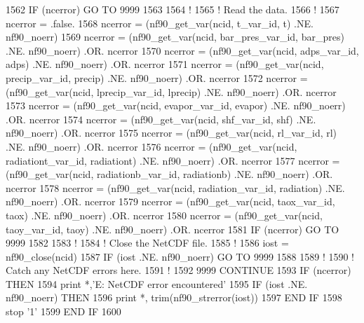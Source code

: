 \begin{DoxyCode}
1562     \textcolor{keywordflow}{IF} (ncerror) \textcolor{keywordflow}{GO TO} 9999
1563 
1564     \textcolor{comment}{!}
1565     \textcolor{comment}{! Read the data.}
1566     \textcolor{comment}{!}
1567     ncerror = .false.
1568     ncerror = (nf90\_get\_var(ncid, t\_var\_id, t)                          .NE. nf90\_noerr)
1569     ncerror = (nf90\_get\_var(ncid, bar\_pres\_var\_id, bar\_pres)            .NE. nf90\_noerr) .OR. ncerror
1570     ncerror = (nf90\_get\_var(ncid, adps\_var\_id, adps)                    .NE. nf90\_noerr) .OR. ncerror
1571     ncerror = (nf90\_get\_var(ncid, precip\_var\_id, precip)                .NE. nf90\_noerr) .OR. ncerror
1572     ncerror = (nf90\_get\_var(ncid, lprecip\_var\_id, lprecip)              .NE. nf90\_noerr) .OR. ncerror
1573     ncerror = (nf90\_get\_var(ncid, evapor\_var\_id, evapor)                .NE. nf90\_noerr) .OR. ncerror
1574     ncerror = (nf90\_get\_var(ncid, shf\_var\_id, shf)                      .NE. nf90\_noerr) .OR. ncerror
1575     ncerror = (nf90\_get\_var(ncid, rl\_var\_id, rl)                        .NE. nf90\_noerr) .OR. ncerror
1576     ncerror = (nf90\_get\_var(ncid, radiationt\_var\_id, radiationt)        .NE. nf90\_noerr) .OR. ncerror
1577     ncerror = (nf90\_get\_var(ncid, radiationb\_var\_id, radiationb)        .NE. nf90\_noerr) .OR. ncerror
1578     ncerror = (nf90\_get\_var(ncid, radiation\_var\_id, radiation)          .NE. nf90\_noerr) .OR. ncerror
1579     ncerror = (nf90\_get\_var(ncid, taox\_var\_id, taox)                    .NE. nf90\_noerr) .OR. ncerror
1580     ncerror = (nf90\_get\_var(ncid, taoy\_var\_id, taoy)                    .NE. nf90\_noerr) .OR. ncerror
1581     \textcolor{keywordflow}{IF} (ncerror) \textcolor{keywordflow}{GO TO} 9999
1582 
1583     \textcolor{comment}{!}
1584     \textcolor{comment}{! Close the NetCDF file.}
1585     \textcolor{comment}{!}
1586     iost    = nf90\_close(ncid)
1587     \textcolor{keywordflow}{IF} (iost .NE. nf90\_noerr) \textcolor{keywordflow}{GO TO} 9999
1588 
1589     \textcolor{comment}{!}
1590     \textcolor{comment}{! Catch any NetCDF errors here.}
1591     \textcolor{comment}{!}
1592     9999 \textcolor{keywordflow}{CONTINUE}
1593     \textcolor{keywordflow}{IF} (ncerror) \textcolor{keywordflow}{THEN}
1594         print *,\textcolor{stringliteral}{'E: NetCDF error encountered'}
1595         \textcolor{keywordflow}{IF} (iost .NE. nf90\_noerr) \textcolor{keywordflow}{THEN}
1596             print *, trim(nf90\_strerror(iost))
1597 \textcolor{keywordflow}{        END IF}
1598         stop \textcolor{stringliteral}{'1'}
1599 \textcolor{keywordflow}{    END IF}
1600 
\end{DoxyCode}



